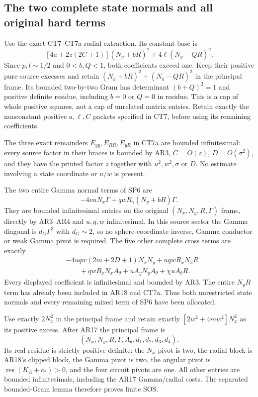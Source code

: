 \subsection{The two complete state normals and all original hard terms}

Use the exact CT7--CT7a radial extraction. Its constant base is
\[
 [4a+2z(2C+1)](N_y+bR)^2+4\ell(N_y-QR)^2.
 \tag{AR18}
\]
Since $p,l\sim1/2$ and $0<b,Q<1$, both coefficients exceed
one. Keep their positive pure-source excesses and retain
$(N_y+bR)^2+(N_y-QR)^2$ in the principal frame. Its bounded
two-by-two Gram has determinant $(b+Q)^2=1$ and positive
definite residue, including $b=0$ or $Q=0$ in residue. This is
a cap of whole positive squares, not a cap of unrelated matrix
entries. Retain exactly the nonconstant positive $a,\ell,C$
packets specified in CT7, before using its remaining coefficients.

The three exact remainders $E_{yy},E_{RR},E_{yR}$ in CT7a are
bounded infinitesimal: every source factor in their braces is
bounded by AR3, $C=O(z)$, $D=O(\sigma^2)$, and they have the
printed factor $z$ together with $u^2,w^2,\sigma$ or $D$.
No estimate involving a state coordinate or $u/w$ is present.

The two entire Gamma normal terms of SP6 are
\[
 -4\nu uN_x\Gamma
          +qwR_\gamma(N_y+bR)\Gamma.
 \tag{AR19}
\]
They are bounded infinitesimal entries on the original
$(N_x,N_y,R,\Gamma)$ frame, directly by AR3--AR4 and
$u,q,w$ infinitesimal. In this source sector the Gamma diagonal
is $d_G\Gamma^2$ with $d_G\sim2$, so no sphere-coordinate
inverse, Gamma conductor or weak Gamma pivot is required.
The five other complete cross terms are exactly
\[
 \begin{split}
 &-4uqw(2m+2D+1)N_xN_y+uqwR_xN_xR\\
 &\qquad+qwB_xN_xA_\theta+uA_yN_yA_\theta
                                      +\chi uA_\theta R.
 \end{split} \tag{AR20}
\]
Every displayed coefficient is infinitesimal and bounded by
AR3. The entire $N_yR$ term has already been included in
AR18 and CT7a. Thus both unrestricted state normals and every
remaining mixed term of SP6 have been allocated.

Use exactly $2N_x^2$ in the principal frame and retain exactly
$[2w^2+4mw^2]N_x^2$ as its positive excess. After AR17 the
principal frame is
\[
          (N_x,N_y,R,\Gamma,A_\theta,d_1,d_2,d_3,d_4).
 \tag{AR21}
\]
Its real residue is strictly positive definite: the $N_x$ pivot
is two, the radial block is AR18's clipped block, the Gamma
pivot is two, the angular pivot is $\operatorname{res}(K_A+c_*)>0$,
and the four circuit pivots are one. All other entries are
bounded infinitesimals, including the AR17 Gamma/radial costs.
The separated bounded-Gram lemma therefore proves finite SOS.

